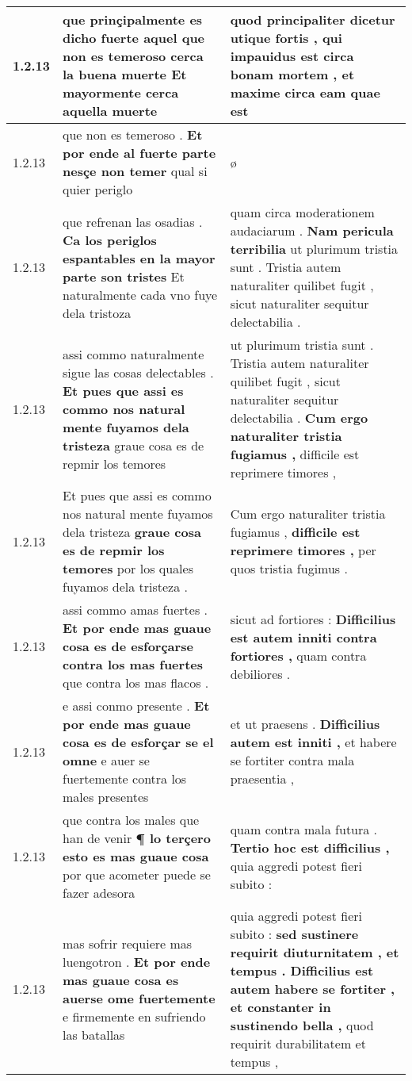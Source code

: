 \begin{tabular}{|p{1cm}|p{6.5cm}|p{6.5cm}|}
1.2.13 & que prinçipalmente es dicho fuerte \textbf{ aquel que non es temeroso cerca la buena muerte } Et mayormente cerca aquella muerte & quod principaliter dicetur utique fortis , \textbf{ qui impauidus est circa bonam mortem , } et maxime circa eam quae est \\\hline
1.2.13 & que non es temeroso . \textbf{ Et por ende al fuerte parte nesçe non temer } qual si quier periglo & ø \\\hline
1.2.13 & que refrenan las osadias . \textbf{ Ca los periglos espantables en la mayor parte son tristes } Et naturalmente cada vno fuye dela tristoza & quam circa moderationem audaciarum . \textbf{ Nam pericula terribilia } ut plurimum tristia sunt . Tristia autem naturaliter quilibet fugit , sicut naturaliter sequitur delectabilia . \\\hline
1.2.13 & assi commo naturalmente sigue las cosas delectables . \textbf{ Et pues que assi es commo nos natural mente fuyamos dela tristeza } graue cosa es de repmir los temores & ut plurimum tristia sunt . Tristia autem naturaliter quilibet fugit , sicut naturaliter sequitur delectabilia . \textbf{ Cum ergo naturaliter tristia fugiamus , } difficile est reprimere timores , \\\hline
1.2.13 & Et pues que assi es commo nos natural mente fuyamos dela tristeza \textbf{ graue cosa es de repmir los temores } por los quales fuyamos dela tristeza . & Cum ergo naturaliter tristia fugiamus , \textbf{ difficile est reprimere timores , } per quos tristia fugimus . \\\hline
1.2.13 & assi commo amas fuertes . \textbf{ Et por ende mas guaue cosa es de esforçarse contra los mas fuertes } que contra los mas flacos . & sicut ad fortiores : \textbf{ Difficilius est autem inniti contra fortiores , } quam contra debiliores . \\\hline
1.2.13 & e assi conmo presente . \textbf{ Et por ende mas guaue cosa es de esforçar se el omne } e auer se fuertemente contra los males presentes & et ut praesens . \textbf{ Difficilius autem est inniti , } et habere se fortiter contra mala praesentia , \\\hline
1.2.13 & que contra los males que han de venir \textbf{ ¶ lo terçero esto es mas guaue cosa } por que acometer puede se fazer adesora & quam contra mala futura . \textbf{ Tertio hoc est difficilius , } quia aggredi potest fieri subito : \\\hline
1.2.13 & mas sofrir requiere mas luengotron . \textbf{ Et por ende mas guaue cosa es auerse ome fuertemente } e firmemente en sufriendo las batallas & quia aggredi potest fieri subito : \textbf{ sed sustinere requirit diuturnitatem , et tempus . Difficilius est autem habere se fortiter , et constanter in sustinendo bella , } quod requirit durabilitatem et tempus , \\\hline

\end{tabular}
